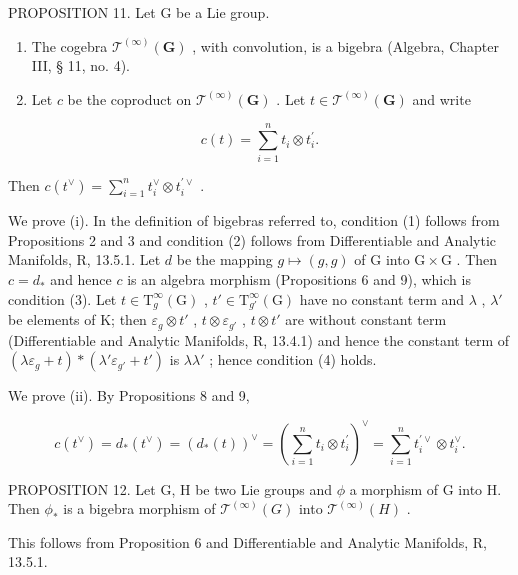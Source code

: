PROPOSITION 11. Let G be a Lie group.

\begin{enumerate}
\def\labelenumi{(\roman{enumi})}
\item
  The cogebra \(\mathcal{T}^{(\infty)}(\mathbf{G})\) , with convolution, is a bigebra (Algebra, Chapter III, § 11, no. 4).
\item
  Let \(c\) be the coproduct on \(\mathcal{T}^{(\infty)}(\mathbf{G})\) . Let \(t \in \mathcal{T}^{(\infty)}(\mathbf{G})\) and write
\end{enumerate}

\[
c (t) = \sum_ {i = 1} ^ {n} t _ {i} \otimes t _ {i} ^ {\prime}.
\]

Then \(c(t^{\vee}) = \sum_{i=1}^{n} t_{i}^{\vee} \otimes t_{i}^{\prime\vee}\) .

We prove (i). In the definition of bigebras referred to, condition (1) follows from Propositions 2 and 3 and condition (2) follows from Differentiable and Analytic Manifolds, R, 13.5.1. Let \(d\) be the mapping \(g \mapsto (g, g)\) of G into \(\mathrm{G} \times \mathrm{G}\) . Then \(c = d_{*}\) and hence \(c\) is an algebra morphism (Propositions 6 and 9), which is condition (3). Let \(t \in \mathrm{T}_{g}^{\infty}(\mathrm{G})\) , \(t' \in \mathrm{T}_{g'}^{\infty}(\mathrm{G})\) have no constant term and \(\lambda\) , \(\lambda'\) be elements of K; then \(\varepsilon_{g} \otimes t'\) , \(t \otimes \varepsilon_{g'}\) , \(t \otimes t'\) are without constant term (Differentiable and Analytic Manifolds, R, 13.4.1) and hence the constant term of \((\lambda\varepsilon_{g} + t) * (\lambda' \varepsilon_{g'} + t')\) is \(\lambda\lambda'\) ; hence condition (4) holds.

We prove (ii). By Propositions 8 and 9,

\[
c (t ^ {\vee}) = d _ {*} (t ^ {\vee}) = (d _ {*} (t)) ^ {\vee} = \left(\sum_ {i = 1} ^ {n} t _ {i} \otimes t _ {i} ^ {\prime}\right) ^ {\vee} = \sum_ {i = 1} ^ {n} t _ {i} ^ {\prime \vee} \otimes t _ {i} ^ {\vee}.
\]

PROPOSITION 12. Let G, H be two Lie groups and \(\phi\) a morphism of G into H. Then \(\phi_{*}\) is a bigebra morphism of \(\mathcal{T}^{(\infty)}(G)\) into \(\mathcal{T}^{(\infty)}(H)\) .

This follows from Proposition 6 and Differentiable and Analytic Manifolds, R, 13.5.1.

